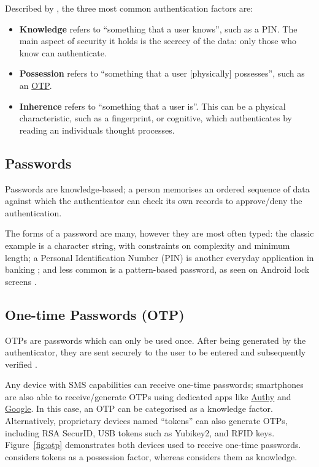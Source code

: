 Described by \cite{surveyOnAuthFactors}, the three most
common authentication factors are: 

\begin{itemize} 

  \item \textbf{Knowledge} \label{p:knowledge} refers to
        \enquote{something that a user knows}, such as a PIN.
        The main aspect of security it holds is the secrecy of the
        data: only those who know can authenticate.

  \item \textbf{Possession} refers to \enquote{something
          that a user [physically] possesses}, such as an
        \hyperref[p:otp]{OTP}.

  \item \textbf{Inherence} refers to \enquote{something
          that a user is}.
        This can be a physical characteristic, such as a
        fingerprint, or cognitive, which authenticates by reading
        an individuals thought processes.
\end{itemize}

\subsection{Passwords}
\label{p:passwords}
Passwords are knowledge-based; a person memorises an
ordered sequence of data against which the authenticator
can check its own records to approve/deny the
authentication.

The forms of a password are many, however they are most
often typed: the classic example is a character string,
with  constraints on complexity and minimum length; a
Personal Identification Number (PIN) is another everyday
application in banking \parencite{whatIsAuth}; and less
common is a pattern-based password, as seen on Android lock
screens \parencite{androidLockScreen}.

\subsection{One-time Passwords (OTP)}
\label{p:otp}
OTPs are passwords which can only be used once.
After being generated by the authenticator, they are sent
securely to the user to be entered and subsequently
verified \parencite{surveyOnAuthFactors}.

Any device with SMS capabilities can receive one-time
passwords; smartphones are also able to receive/generate
OTPs using dedicated apps like
\href{https://www.twilio.com/authy/features/totp}{Authy}
and \href{https://play.google.com/store/apps/details?
  id=com.google.android.apps.authenticator2}{Google}.
In this case, an OTP can be categorised as a knowledge
factor\parencite{surveyOnAuthFactors, evalOfAuthMethods}.
Alternatively, proprietary devices named \enquote{tokens}
can also generate OTPs, including RSA SecurID, USB tokens
such as Yubikey2, and RFID keys.
Figure~\ref{fig:otp} demonstrates both devices used to
receive one-time passwords.
\cite{evalOfAuthMethods} considers tokens
as a possession factor, whereas
\cite{surveyOnAuthFactors} considers them as
knowledge.

